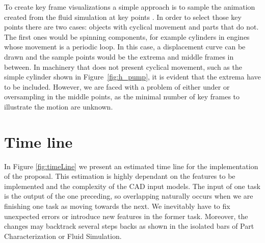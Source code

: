 To create key frame visualizations a simple approach is to sample the animation created from the fluid simulation at key points \cite{Mitra2010}.
In order to select those key points there are two cases: objects with cyclical movement and parts that do not.
The first ones would be spinning components, for example cylinders in engines whose movement is a periodic loop.
In this case, a displacement curve can be drawn and the sample points would be the extrema and middle frames in between.
In machinery that does not present cyclical movement, such as the simple cylinder shown in Figure~\ref{fig:h_pump}, it is evident that the extrema have to be included.
However, we are faced with a problem of either under or oversampling in the middle points, as the minimal number of key frames to illustrate the motion are unknown. 

\section{Time line}

In Figure \ref{fig:timeLine} we present an estimated time line for the implementation of the proposal.
This estimation is highly dependant on the features to be implemented and the complexity of the CAD input models.
The input of one task is the output of the one preceding, so overlapping naturally occurs when we are finishing one task as moving towards the  next.
We inevitably have to fix unexpected errors or introduce new features in the former task.
Moreover, the changes may backtrack several steps backs as shown in the isolated bars of Part Characterization or Fluid Simulation.

